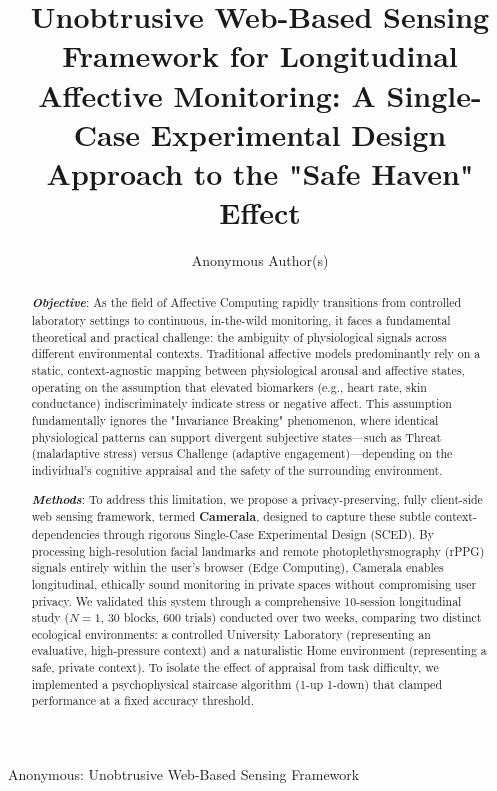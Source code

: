 \documentclass[journal]{IEEEtran}
\begin{document}
\title{Unobtrusive Web-Based Sensing Framework for Longitudinal Affective Monitoring: A Single-Case Experimental Design Approach to the "Safe Haven" Effect}

\author{Anonymous Author(s)}

%
{Anonymous: Unobtrusive Web-Based Sensing Framework}

\maketitle

\begin{abstract}
\textbf{\textit{Objective}}: As the field of Affective Computing rapidly transitions from controlled laboratory settings 
to continuous, in-the-wild monitoring, it faces a fundamental theoretical and practical challenge: 
the ambiguity of physiological signals across different environmental contexts. 
Traditional affective models predominantly rely on a static, context-agnostic mapping between physiological arousal and affective states, 
operating on the assumption that elevated biomarkers (e.g., heart rate, skin conductance) indiscriminately indicate stress or negative affect. 
This assumption fundamentally ignores the "Invariance Breaking" phenomenon, where identical physiological patterns can support 
divergent subjective states—such as Threat (maladaptive stress) versus Challenge (adaptive engagement)—depending on the 
individual's cognitive appraisal and the safety of the surrounding environment.

\textbf{\textit{Methods}}: To address this limitation, we propose a privacy-preserving, fully client-side web sensing framework, 
termed \textbf{Camerala}, designed to capture these subtle context-dependencies through rigorous Single-Case Experimental Design (SCED). 
By processing high-resolution facial landmarks and remote photoplethysmography (rPPG) signals entirely within the user's browser (Edge Computing), 
Camerala enables longitudinal, ethically sound monitoring in private spaces without compromising user privacy. 
We validated this system through a comprehensive 10-session longitudinal study ($N=1$, 30 blocks, 600 trials) conducted over two weeks, 
comparing two distinct ecological environments: a controlled University Laboratory (representing an evaluative, high-pressure context) 
and a naturalistic Home environment (representing a safe, private context). 
To isolate the effect of appraisal from task difficulty, we implemented a psychophysical staircase algorithm (1-up 1-down) 
that clamped performance at a fixed accuracy threshold.


\end{abstract}
\end{document}
